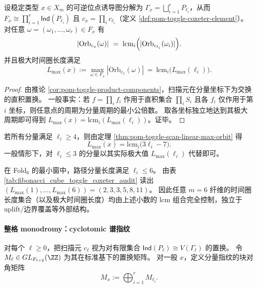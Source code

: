 \begin{theorem}\label{thm:pom-toggle-scan-lcm-tensorization}
设稳定类型 \(x\in X_m\) 的可逆位点诱导图分解为 \(\Gamma_x=\bigsqcup_{i=1}^r P_{\ell_i}\)，从而
\(
F_x\cong \prod_{i=1}^r \mathsf{Ind}(P_{\ell_i})
\)
且 \(c_x=\prod_i c_{\ell_i}\)（定义 \ref{def:pom-toggle-coxeter-element}）。
对任意 \(\omega=(\omega_1,\dots,\omega_r)\in F_x\) 有
\[
|\mathrm{Orb}_{c_x}(\omega)|
\ =\
\mathrm{lcm}_{i}\Bigl(|\mathrm{Orb}_{c_{\ell_i}}(\omega_i)|\Bigr).
\]
并且极大时间圈长度满足
\[
L_{\max}(x):=\max_{\omega\in F_x} |\mathrm{Orb}_{c_x}(\omega)|
\ =\
\mathrm{lcm}_{i}\bigl(L_{\max}(\ell_i)\bigr).
\]
\end{theorem}
\begin{proof}
由推论 \ref{cor:pom-toggle-product-components}，扫描元在分量坐标下为交换的直积置换。
一般事实：若 \(f=\prod_i f_i\) 作用于直积集合 \(\prod_i S_i\) 且各 \(f_i\) 仅作用于第 \(i\) 坐标，则任意点的周期为分量周期的最小公倍数。
取各坐标独立地达到其极大周期即可得到 \(L_{\max}(x)=\mathrm{lcm}_i(L_{\max}(\ell_i))\)。证毕。
\end{proof}

\begin{corollary}[极大时间圈的算术组合律]\label{cor:pom-toggle-scan-max-orbit-arithmetic}
若所有分量满足 \(\ell_i\ge 4\)，则由定理 \ref{thm:pom-toggle-scan-linear-max-orbit} 得
\[
L_{\max}(x)=\mathrm{lcm}_{i}\bigl(3\ell_i-7\bigr).
\]
一般情形下，对 \(\ell_i\le 3\) 的分量以其实际极大值 \(L_{\max}(\ell_i)\) 代替即可。
\end{corollary}

\begin{remark}\label{rem:pom-toggle-fold6-lmax}
在 Fold\(_6\) 的最小窗中，路径分量长度满足 \(\ell_i\le 6\)。
由表 \ref{tab:fibonacci_cube_toggle_coxeter_audit} 读出
\(
(L_{\max}(1),\dots,L_{\max}(6))=(2,3,3,5,8,11)
\)。
因此任意 \(m=6\) 纤维的时间圈长度集合（以及极大时间圈长度）均由上述小数的 \(\mathrm{lcm}\) 组合完全控制，独立于 uplift/边界覆盖等外部结构。
\end{remark}



\paragraph{整格 monodromy：cyclotomic 谱指纹}

\begin{definition}[置换单odromy 矩阵]\label{def:pom-coxeter-monodromy}
对每个 \(\ell\ge 0\)，把扫描元 \(c_\ell\) 视为对有限集合 \(\mathsf{Ind}(P_\ell)\cong V(\Gamma_\ell)\) 的置换。
令 \(M_\ell\in GL_{F_{\ell+2}}(\ZZ)\) 为其在标准基下的置换矩阵。
对一般 \(x\)，定义分量指纹的块对角矩阵
\[
M_x:=\bigoplus_{i=1}^r M_{\ell_i}.
\]
\end{definition}

